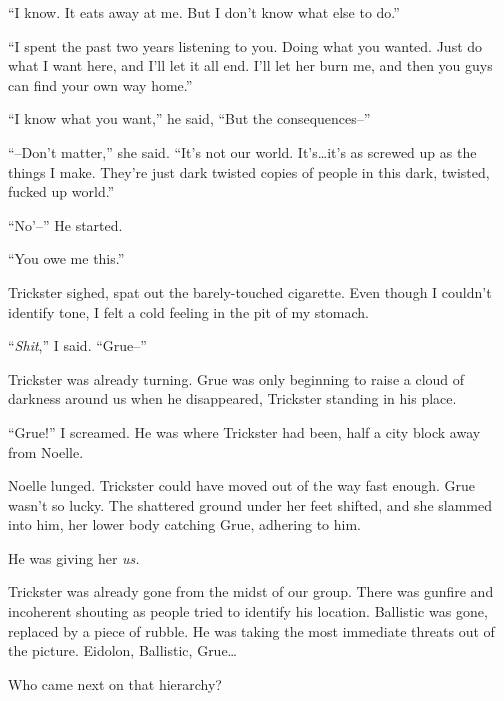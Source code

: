 ``I know.  It eats away at me.  But I don't know what else to do.''



``I spent the past two years listening to you.  Doing what you wanted.  Just do what I want here, and I'll let it all end.  I'll let her burn me, and then you guys can find your own way home.''



``I know what you want,'' he said, ``But the consequences--''



``--Don't matter,'' she said.  ``It's not our world.  It's\ldots it's as screwed up as the things I make.  They're just dark twisted copies of people in this dark, twisted, fucked up world.''



``No'--'' He started.



``You owe me this.''



Trickster sighed, spat out the barely-touched cigarette.  Even though I couldn't identify tone, I felt a cold feeling in the pit of my stomach.



``\emph{Shit},'' I said.  ``Grue--''



Trickster was already turning.  Grue was only beginning to raise a cloud of darkness around us when he disappeared, Trickster standing in his place.



``Grue!'' I screamed.  He was where Trickster had been, half a city block away from Noelle.



Noelle lunged.  Trickster could have moved out of the way fast enough.  Grue wasn't so lucky.  The shattered ground under her feet shifted, and she slammed into him, her lower body catching Grue, adhering to him.



He was giving her\emph{ us.}



Trickster was already gone from the midst of our group. There was gunfire and incoherent shouting as people tried to identify his location.  Ballistic was gone, replaced by a piece of rubble.  He was taking the most immediate threats out of the picture.  Eidolon, Ballistic, Grue\ldots



Who came next on that hierarchy?




